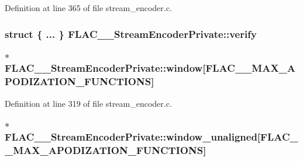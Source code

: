 Definition at line 365 of file stream\+\_\+encoder.\+c.

\subsubsection[{\texorpdfstring{verify}{verify}}]{\setlength{\rightskip}{0pt plus 5cm}struct \{ ... \}   F\+L\+A\+C\+\_\+\+\_\+\+Stream\+Encoder\+Private\+::verify}\hypertarget{struct_f_l_a_c_____stream_encoder_private_a73a036e52f35aee6fe55f78ed5be68d4}{}\label{struct_f_l_a_c_____stream_encoder_private_a73a036e52f35aee6fe55f78ed5be68d4}
\subsubsection[{\texorpdfstring{window}{window}}]{$\ast$ F\+L\+A\+C\+\_\+\+\_\+\+Stream\+Encoder\+Private\+::window\mbox{[}{\bf F\+L\+A\+C\+\_\+\+\_\+\+M\+A\+X\+\_\+\+A\+P\+O\+D\+I\+Z\+A\+T\+I\+O\+N\+\_\+\+F\+U\+N\+C\+T\+I\+O\+NS}\mbox{]}}\hypertarget{struct_f_l_a_c_____stream_encoder_private_a2ad0c9a1fb526cb8f7347284b89398f5}{}\label{struct_f_l_a_c_____stream_encoder_private_a2ad0c9a1fb526cb8f7347284b89398f5}


Definition at line 319 of file stream\+\_\+encoder.\+c.

\subsubsection[{\texorpdfstring{window\+\_\+unaligned}{window_unaligned}}]{$\ast$ F\+L\+A\+C\+\_\+\+\_\+\+Stream\+Encoder\+Private\+::window\+\_\+unaligned\mbox{[}{\bf F\+L\+A\+C\+\_\+\+\_\+\+M\+A\+X\+\_\+\+A\+P\+O\+D\+I\+Z\+A\+T\+I\+O\+N\+\_\+\+F\+U\+N\+C\+T\+I\+O\+NS}\mbox{]}}\hypertarget{struct_f_l_a_c_____stream_encoder_private_a14ae296508bb7af62fe189452c1be0a9}{}\label{struct_f_l_a_c_____stream_encoder_private_a14ae296508bb7af62fe189452c1be0a9}


